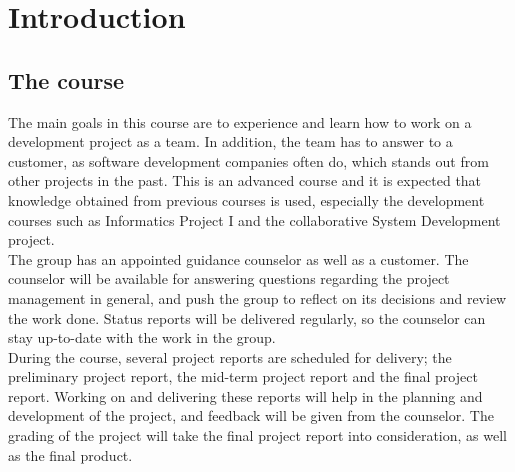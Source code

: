 \section{Introduction}
\subsection{The course}
										
The main goals in this course are to experience and learn how to work on a 
development project as a team. In addition, the team has to answer to a 
customer, as software development companies often do, which stands out from 
other projects in the past. This is an advanced course and it is expected that 
knowledge obtained from previous courses is used, especially the development 
courses such as Informatics Project I and the collaborative System Development 
project. \\

The group has an appointed guidance counselor as well as a customer. The 
counselor will be available for answering questions regarding the project 
management in general, and push the group to reflect on its decisions and 
review the work done. Status reports will be delivered regularly, so the 
counselor can stay up-to-date with the work in the group. \\

During the course, several project reports are scheduled for delivery; the 
preliminary project report, the mid-term project report and the final project 
report. Working on and delivering these reports will help in the planning and 
development of the project, and feedback will be given from the counselor. The 
grading of the project will take the final project report into consideration, 
as well as the final product.\\

